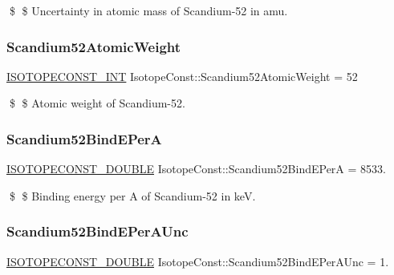 \$ \$ Uncertainty in atomic mass of Scandium-\/52 in amu. \mbox{\label{group___isotope_const-_scandium-_sc52_ga114a5aaf6ad30c30a75cb1c6902eea9c}} 
\subsubsection{\texorpdfstring{Scandium52\+Atomic\+Weight}{Scandium52AtomicWeight}}
{\footnotesize\ttfamily \mbox{\hyperlink{group___isotope_const-_macros_ga5f18360b3e99483a35c32d789e62621c}{I\+S\+O\+T\+O\+P\+E\+C\+O\+N\+S\+T\+\_\+\+I\+NT}} Isotope\+Const\+::\+Scandium52\+Atomic\+Weight = 52}

\$ \$ Atomic weight of Scandium-\/52. \mbox{\label{group___isotope_const-_scandium-_sc52_ga6034be91f0ac0c88784a00c6a36d0e2f}} 
\subsubsection{\texorpdfstring{Scandium52\+Bind\+E\+PerA}{Scandium52BindEPerA}}
{\footnotesize\ttfamily \mbox{\hyperlink{group___isotope_const-_macros_ga8f45a7272ce02c0b4c65c44636ed719a}{I\+S\+O\+T\+O\+P\+E\+C\+O\+N\+S\+T\+\_\+\+D\+O\+U\+B\+LE}} Isotope\+Const\+::\+Scandium52\+Bind\+E\+PerA = 8533.}

\$ \$ Binding energy per A of Scandium-\/52 in keV. \mbox{\label{group___isotope_const-_scandium-_sc52_gacfeac69faa6776babab71bd03615b1d0}} 
\subsubsection{\texorpdfstring{Scandium52\+Bind\+E\+Per\+A\+Unc}{Scandium52BindEPerAUnc}}
{\footnotesize\ttfamily \mbox{\hyperlink{group___isotope_const-_macros_ga8f45a7272ce02c0b4c65c44636ed719a}{I\+S\+O\+T\+O\+P\+E\+C\+O\+N\+S\+T\+\_\+\+D\+O\+U\+B\+LE}} Isotope\+Const\+::\+Scandium52\+Bind\+E\+Per\+A\+Unc = 1.}

